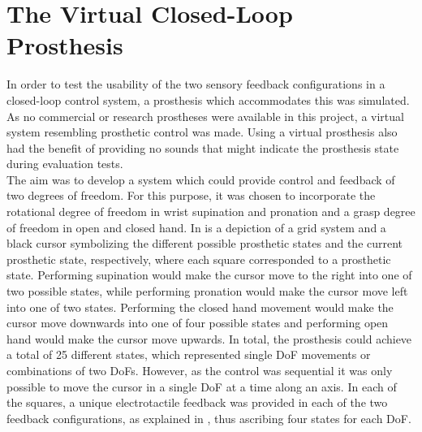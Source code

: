 
\section{The Virtual Closed-Loop Prosthesis} \label{sec:vp}

In order to test the usability of the two sensory feedback configurations in a closed-loop control system, a prosthesis which accommodates this was simulated. As no commercial or research prostheses were available in this project, a virtual system resembling prosthetic control was made. Using a virtual prosthesis also had the benefit of providing no sounds that might indicate the prosthesis state during evaluation tests. \\
The aim was to develop a system which could provide control and feedback of two degrees of freedom. For this purpose, it was chosen to incorporate the rotational degree of freedom in wrist supination and pronation and a grasp degree of freedom in open and closed hand. In  is a depiction of a grid system and a black cursor symbolizing the different possible prosthetic states and the current prosthetic state, respectively, where each square corresponded to a prosthetic state. Performing supination would make the cursor move to the right into one of two possible states, while performing pronation would make the cursor move left into one of two states. Performing the closed hand movement would make the cursor move downwards into one of four possible states and performing open hand would make the cursor move upwards. In total, the prosthesis could achieve a total of 25 different states, which represented single DoF movements or combinations of two DoFs. However, as the control was sequential it was only possible to move the cursor in a single DoF at a time along an axis. In each of the squares, a unique electrotactile feedback was provided in each of the two feedback configurations, as explained in , thus ascribing four states for each DoF.      
     

